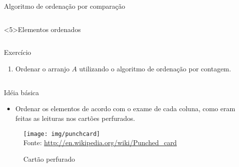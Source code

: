 \begin{frame}[fragile]{Algoritmo de ordenação por comparação}
\begin{columns}
\begin{column}{.5\textwidth}
\vspace{-4cm}
\begin{block}<5>{Elementos ordenados}
\end{block}

\end{column}
\end{columns}
\end{frame}


\begin{frame}{Exercício}

\begin{enumerate}
\item Ordenar o arranjo $A$ utilizando o algoritmo de ordenação por contagem.
\end{enumerate}


\end{frame}


\subsection{\insertlecture}

\begin{frame}[plain]
\title{\insertlecture}
\maketitle
\end{frame}

\begin{frame}{\insertlecture}

\begin{block}{Idéia básica}
\begin{itemize}
\item Ordenar os elementos de acordo com o exame de cada coluna, como
eram feitas as leituras nos cartões perfurados.
\end{itemize}
\end{block}

\begin{figure}[hf]
\caption{Cartão perfurado}
\label{puchcard}
\texttt{[image: img/punchcard]}\\
{\tiny Fonte: \url{http://en.wikipedia.org/wiki/Punched_card}}
\end{figure}

\end{frame}

